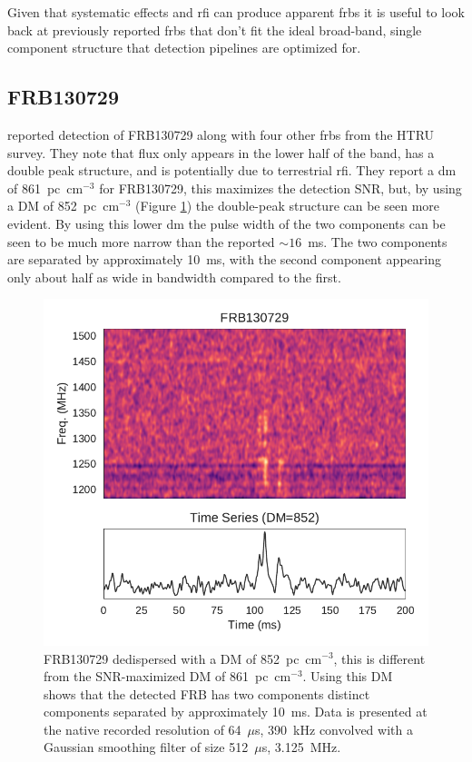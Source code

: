 \documentclass[a4paper,fleqn,usenatbib]{mnras}
\begin{document}
Given that systematic effects and \gls{rfi} can produce apparent \glspl{frb} it
is useful to look back at previously reported \glspl{frb} that don't fit the
ideal broad-band, single component structure that detection pipelines are
optimized for.

\subsection{FRB130729}

\cite{2016MNRAS.460L..30C} reported detection of FRB130729 along with four other
\glspl{frb} from the HTRU survey. They note that flux only appears in the lower
half of the band, has a double peak structure, and is potentially due to
terrestrial \gls{rfi}.  They report a \gls{dm} of 861~pc~cm$^{-3}$ for
FRB130729, this maximizes the detection SNR, but, by using a DM of
852~pc~cm$^{-3}$ (Figure \ref{fig:FRB130729}) the double-peak structure can be
seen more evident. By using this lower \gls{dm} the pulse width of the two
components can be seen to be much more narrow than the reported $\sim 16$~ms.
The two components are separated by approximately 10~ms, with the second
component appearing only about half as wide in bandwidth compared to the first. 

\begin{figure}
    \includegraphics[width=1.0\linewidth]{figures/FRB130729.pdf}
    \caption{FRB130729 dedispersed with a DM of 852~pc~cm$^{-3}$, this is
    different from the SNR-maximized DM of 861~pc~cm$^{-3}$. Using this DM shows
    that the detected FRB has two components distinct components separated by
    approximately 10~ms. Data is presented at the native recorded resolution of
    64~$\mu$s, 390~kHz convolved with a Gaussian smoothing filter of size
    512~$\mu$s, 3.125~MHz.
    }
    \label{fig:FRB130729}
\end{figure}
\end{document}
